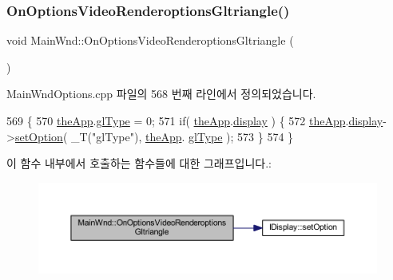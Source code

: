 \subsubsection{\texorpdfstring{On\+Options\+Video\+Renderoptions\+Gltriangle()}{OnOptionsVideoRenderoptionsGltriangle()}}
{\footnotesize\ttfamily void Main\+Wnd\+::\+On\+Options\+Video\+Renderoptions\+Gltriangle (\begin{DoxyParamCaption}{ }\end{DoxyParamCaption})\hspace{0.3cm}{\ttfamily [protected]}}



Main\+Wnd\+Options.\+cpp 파일의 568 번째 라인에서 정의되었습니다.


\begin{DoxyCode}
569 \{
570     \mbox{\hyperlink{_v_b_a_8cpp_a8095a9d06b37a7efe3723f3218ad8fb3}{theApp}}.\mbox{\hyperlink{class_v_b_a_afb5faab6c2ddf2661b2fe19f118fd882}{glType}} = 0;
571     \textcolor{keywordflow}{if}( \mbox{\hyperlink{_v_b_a_8cpp_a8095a9d06b37a7efe3723f3218ad8fb3}{theApp}}.\mbox{\hyperlink{class_v_b_a_a940e5bad8b3ed2436888dbcd03bfd563}{display}} ) \{
572         \mbox{\hyperlink{_v_b_a_8cpp_a8095a9d06b37a7efe3723f3218ad8fb3}{theApp}}.\mbox{\hyperlink{class_v_b_a_a940e5bad8b3ed2436888dbcd03bfd563}{display}}->\mbox{\hyperlink{class_i_display_a1766244708c252bb8781892c76c20ba9}{setOption}}( \_T(\textcolor{stringliteral}{"glType"}), \mbox{\hyperlink{_v_b_a_8cpp_a8095a9d06b37a7efe3723f3218ad8fb3}{theApp}}.
      \mbox{\hyperlink{class_v_b_a_afb5faab6c2ddf2661b2fe19f118fd882}{glType}} );
573     \}
574 \}
\end{DoxyCode}
이 함수 내부에서 호출하는 함수들에 대한 그래프입니다.\+:
\nopagebreak
\begin{figure}[H]
\begin{center}
\leavevmode
\includegraphics[width=350pt]{class_main_wnd_a80f5fb3891f417bc919adc26f5773a08_cgraph}
\end{center}
\end{figure}
\mbox{\label{class_main_wnd_a38b0a1dbd8af4407e43866565ffb9bad}} 

